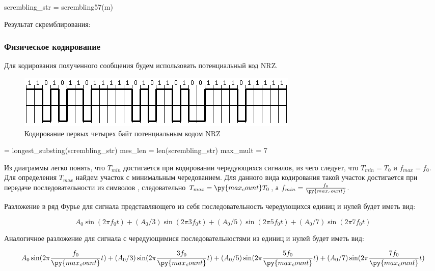 \documentclass[12pt, a4paper]{article}
\begin{document}
\begin{pycode}
scrembling_str = scrembling57(m)
\end{pycode}

Результат скремблирования:\\

\subsubsection*{Физическое кодирование}

Для кодирования полученного сообщения будем использовать потенциальный код NRZ.

\begin{figure}[h]
  \begin{center}
    \includegraphics{nrz_scr}
    \caption{Кодирование первых четырех байт потенциальным кодом NRZ}
  \end{center}
\end{figure}

\begin{pycode}
 = longest_substing(scrembling_str)
mes_len = len(scrembling_str)
max_mult = 7
\end{pycode}

Из диаграммы легко понять, что $T_{min}$ достигается при кодировании чередующихся
сигналов, из чего следует, что $T_{min} = T_0$ и $f_{max} = f_0$. Для определения
$T_{max}$ найдем участок с минимальным чередованием. Для данного вида кодирования
такой участок достигается при передаче последовательности из 
символов \texttt{},
следовательно $T_{max} = \py{max_count} T_0$, а $f_{min} = \frac{f_0}{\py{max_count}}$.

Разложение в ряд Фурье для сигнала представляющего из себя последовательность
чередующихся единиц и нулей будет иметь вид:

$$A_0 \sin(2 \pi f_0 t) + (A_0 / 3) \sin(2 \pi 3 f_0 t) +
  (A_0 / 5) \sin(2 \pi 5 f_0 t) + (A_0 / 7) \sin(2 \pi 7 f_0 t)$$

Аналогичное разложение для сигнала с чередующимися последовательностями из
 единиц и нулей будет иметь вид:

$$A_0 \sin(2 \pi \frac{f_0}{\py{max_count}} t) + (A_0 / 3) \sin(2 \pi \frac{3 f_0}{\py{max_count}} t) +
  (A_0 / 5) \sin(2 \pi \frac{5 f_0}{\py{max_count}} t) + (A_0 / 7) \sin(2 \pi \frac{7 f_0}{\py{max_count}} t)$$
\end{document}
